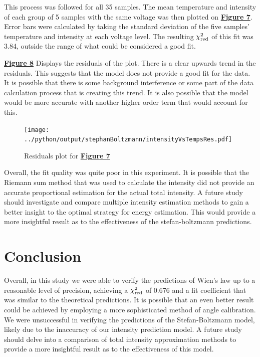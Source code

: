 \documentclass[
	letterpaper
	12pt
]{template}
\newcommand{\bref}[2]{\textbf{\hyperref[#1]{#2}}}
\begin{document}
This process was followed for all 35 samples. The mean temperature and intensity of each group of 5 samples with the same voltage was then plotted on \bref{fig::expTwo}{Figure 7}. Error bars were calculated by taking the standard deviation of the five samples' temperature and intensity at each voltage level. The resulting $\chi^2_{\rm red}$ of this fit was 3.84, outside the range of what could be considered a good fit.\vspace\baselineskip

\bref{fig::expTwoRes}{Figure 8} Displays the residuals of the plot. There is a clear upwards trend in the residuals. This suggests that the model does not provide a good fit for the data. It is possible that there is some background interference or some part of the data calculation process that is creating this trend. It is also possible that the model would be more accurate with another higher order term that would account for this.\vspace\baselineskip

\begin{figure}\label{fig::expTwoRes}
	\vspace{-25pt}
	\texttt{[image: ../python/output/stephanBoltzmann/intensityVsTempsRes.pdf]}
	\caption{Residuals plot for \bref{fig::expTwo}{Figure 7}}
	\vspace{-40pt}
\end{figure}

Overall, the fit quality was quite poor in this experiment. It is possible that the Riemann sum method that was used to calculate the intensity did not provide an accurate proportional estimation for the actual total intensity. A future study should investigate and compare multiple intensity estimation methods to gain a better insight to the optimal strategy for energy estimation. This would provide a more insightful result as to the effectiveness of the stefan-boltzmann predictions.
\section{Conclusion}
Overall, in this study we were able to verify the predictions of Wien's law up to a reasonable level of precision, achieving a $\chi_{\rm red}^2$ of 0.676 and a fit coefficient that was similar to the theoretical predictions. It is possible that an even better result could be achieved by employing a more sophisticated method of angle calibration. We were unsuccessful in verifying the predictions of the Stefan-Boltzmann model, likely due to the inaccuracy of our intensity prediction model. A future study should delve into a comparison of total intensity approximation methods to provide a more insightful result as to the effectiveness of this model.


\end{document}
